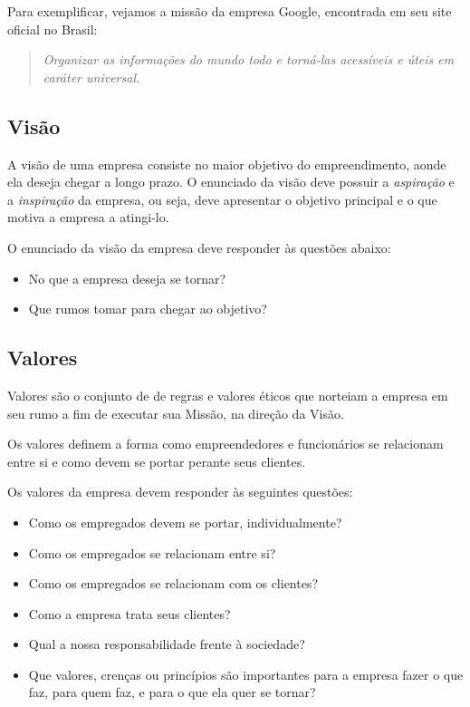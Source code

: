 \documentclass[12pt]{article}
\begin{document}
Para exemplificar, vejamos a missão da empresa Google, encontrada em seu site oficial no Brasil:


\begin{quote}
\textit{Organizar as informações do mundo todo e torná-las acessíveis e úteis em caráter universal.}
\end{quote}


\subsection{Visão}

A visão de uma empresa consiste no maior objetivo do empreendimento, aonde ela deseja chegar a longo prazo. O enunciado da visão deve possuir a \textit{aspiração} e a 
\textit{inspiração} da empresa, ou seja, deve apresentar o objetivo principal e o que motiva a empresa a atingi-lo.

O enunciado da visão da empresa deve responder às questões abaixo:

\begin{itemize}

	\item No que a empresa deseja se tornar?
	\item Que rumos tomar para chegar ao objetivo?

\end{itemize}


\subsection{Valores}

Valores são o conjunto de de regras e valores éticos que norteiam a empresa em seu rumo a fim de executar sua Missão, na direção da Visão.

Os valores definem a forma como empreendedores e funcionários se relacionam entre si e como devem se portar perante seus clientes.

Os valores da empresa devem responder às seguintes questões:

\begin{itemize}

	\item Como os empregados devem se portar, individualmente?
	\item Como os empregados se relacionam entre si?
	\item Como os empregados se relacionam com os clientes?
	\item Como a empresa trata seus clientes?
	\item Qual a nossa responsabilidade frente à sociedade?
	\item Que valores, crenças ou princípios são importantes para a empresa fazer o que faz, para quem faz, e para o que ela quer se tornar?

\end{itemize}
\end{document}
